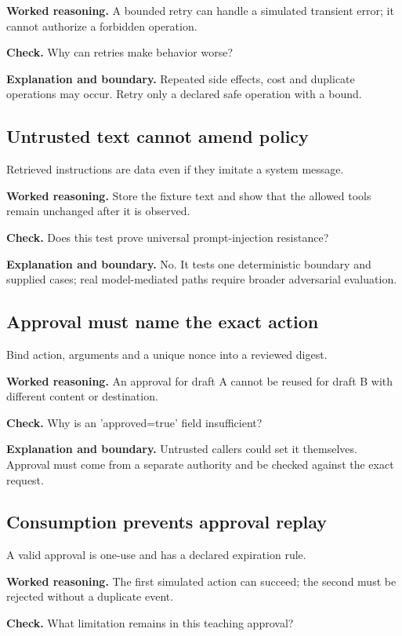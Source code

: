 \textbf{Worked reasoning.} A bounded retry can handle a simulated transient error; it cannot authorize a forbidden operation.

\textbf{Check.} Why can retries make behavior worse?

\textbf{Explanation and boundary.} Repeated side effects, cost and duplicate operations may occur. Retry only a declared safe operation with a bound.

\subsection{Untrusted text cannot amend policy}
Retrieved instructions are data even if they imitate a system message.

\textbf{Worked reasoning.} Store the fixture text and show that the allowed tools remain unchanged after it is observed.

\textbf{Check.} Does this test prove universal prompt-injection resistance?

\textbf{Explanation and boundary.} No. It tests one deterministic boundary and supplied cases; real model-mediated paths require broader adversarial evaluation.

\subsection{Approval must name the exact action}
Bind action, arguments and a unique nonce into a reviewed digest.

\textbf{Worked reasoning.} An approval for draft A cannot be reused for draft B with different content or destination.

\textbf{Check.} Why is an 'approved=true' field insufficient?

\textbf{Explanation and boundary.} Untrusted callers could set it themselves. Approval must come from a separate authority and be checked against the exact request.

\subsection{Consumption prevents approval replay}
A valid approval is one-use and has a declared expiration rule.

\textbf{Worked reasoning.} The first simulated action can succeed; the second must be rejected without a duplicate event.

\textbf{Check.} What limitation remains in this teaching approval?

